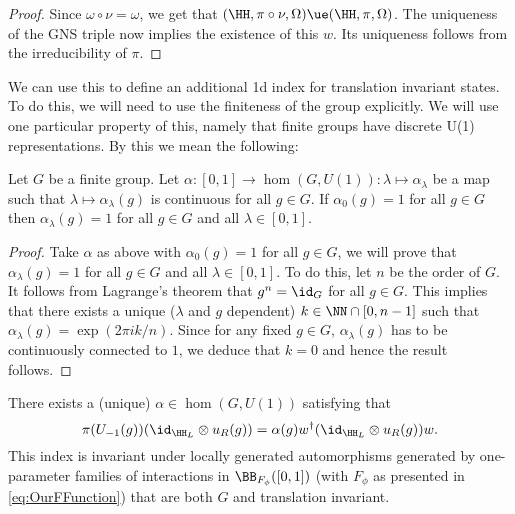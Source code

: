 \begin{proof}
	Since $\omega\circ\nu=\omega$, we get that $(\HH,\pi\circ\nu,\Omega)\ue (\HH,\pi,\Omega)$. The uniqueness of the GNS triple now implies the existence of this $w$. Its uniqueness follows from the irreducibility of $\pi$.
\end{proof}
We can use this to define an additional 1d index for translation invariant states. To do this, we will need to use the finiteness of the group explicitly. We will use one particular property of this, namely that finite groups have discrete U(1) representations. By this we mean the following:
\begin{lemma}\label{lem:FiniteGroupsHaveDiscreteU(1)Representations}
	Let $G$ be a finite group. Let $\alpha:[0,1]\rightarrow\hom(G,U(1)):\lambda\mapsto \alpha_\lambda$ be a map such that $\lambda\mapsto\alpha_\lambda(g)$ is continuous for all $g\in G$. If $\alpha_0(g)=1$ for all $g\in G$ then $\alpha_\lambda(g)=1$ for all $g\in G$ and all $\lambda\in[0,1]$.
\end{lemma}
\begin{proof}
	Take $\alpha$ as above with $\alpha_0(g)=1$ for all $g\in G$, we will prove that $\alpha_\lambda(g)=1$ for all $g\in G$ and all $\lambda\in[0,1]$. To do this, let $n$ be the order of $G$. It follows from Lagrange's theorem that $g^n=\id_G$ for all $g\in G$. This implies that there exists a unique ($\lambda$ and $g$ dependent) $k\in\NN\cap [0,n-1]$ such that $\alpha_\lambda(g)=\exp(2\pi ik/n)$. Since for any fixed $g\in G$,  $\alpha_\lambda(g)$ has to be continuously connected to $1$, we deduce that $k=0$ and hence the result follows.
\end{proof}
\begin{lemma}
	There exists a (unique) $\alpha\in\hom(G,U(1))$ satisfying that
	\begin{equation}
		\pi(U_{-1}(g)) (\id_{\HH_L}\otimes u_R(g))=\alpha(g)w^\dagger(\id_{\HH_L}\otimes u_R(g)) w.
	\end{equation}
	This index is invariant under locally generated automorphisms generated by one-parameter families of interactions in $\BB_{F_\phi}([0,1])$ (with $F_\phi$ as presented in \eqref{eq:OurFFunction}) that are both $G$ and translation invariant.
\end{lemma}
